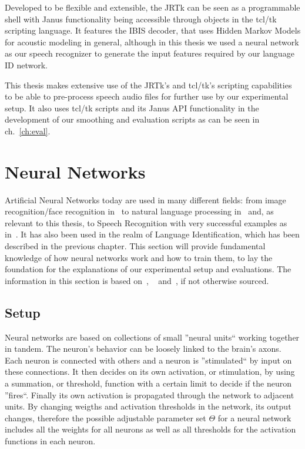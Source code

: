 Developed to be flexible and extensible, the JRTk can be seen as a programmable shell with Janus functionality being accessible through objects in the tcl/tk scripting language. It features the IBIS decoder, that uses Hidden Markov Models for acoustic modeling in general, although in this thesis we used a neural network as our speech recognizer to generate the input features required by our language ID network.

This thesis makes extensive use of the JRTk's and tcl/tk's scripting capabilities to be able to pre-process speech audio files for further use by our experimental setup. It also uses tcl/tk scripts and its Janus API functionality in the development of our smoothing and evaluation scripts as can be seen in ch.~\ref{ch:eval}.
\section{Neural Networks}
\label{sec:fund:NN}
Artificial Neural Networks today are used in many different fields: from image recognition/face recognition in~\cite{lawrence1997face} to natural language processing in~\cite{collobert2008unified} and, as relevant to this thesis, to Speech Recognition with very successful examples as in~\cite{hinton2012deep}. It has also been used in the realm of Language Identification, which has been described in the previous chapter. This section will provide fundamental knowledge of how neural networks work and how to train them, to lay the foundation for the explanations of our experimental setup and evaluations. The information in this section is based on~\cite{haykin2004comprehensive}, ~\cite{Goodfellow-et-al-2016} and~\cite{deeplearning-online}, if not otherwise sourced.


\subsection{Setup}
\label{sec:fund:general}
Neural networks are based on collections of small ''neural units``  working together in tandem. The neuron's behavior can be loosely linked to the brain's axons. Each neuron is connected with others and a neuron is ''stimulated`` by input on these connections. It then decides on its own activation, or stimulation, by using a summation, or threshold, function with a certain limit to decide if the neuron ''fires``. Finally its own activation is propagated through the network to adjacent units. By changing weigths and activation thresholds in the network, its output changes, therefore the possible adjustable parameter set \(\Theta\) for a neural network includes all the weights for all neurons as well as all thresholds for the activation functions in each neuron.


